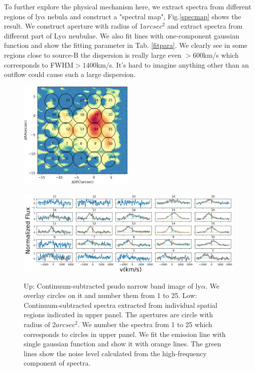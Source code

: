 \documentclass[../Results.tex]{subfiles}
\begin{document}
	To further explore the physical mechanism here, we extract spectra from different regions of ly$\alpha$ nebula and construct a "spectral map", Fig.\ref{specmap} shows the result. We construct aperture with radius of 1$arcsec^{2}$ and extract spectra from different part of Ly$\alpha$ neubulae. We also fit lines with one-component gaussian function and show the fitting parameter in Tab. \ref{fitpara}. We clearly see in some regions close to source-B the dispersion is really large even $>600$km/s which corresponds to FWHM$>1400$km/s. It's hard to imagine anything other than an outflow could cause such a large dispersion.
	\begin{figure}[htp]
		\centering
		\includegraphics[width=0.5\textwidth]{figs/apertmap.png}
	\end{figure}
	\begin{figure}[htp]
		\centering
		\includegraphics[width=\textwidth,height=0.45\textwidth]{figs/specmap}
		\label{spectralss}
		\caption{Up: Continuum-subtracted psudo narrow band image of ly$\alpha$. We overlay circles on it and number them from 1 to 25.  Low: Continuum-subtracted spectra extracted from individual spatial regions indicated in upper panel. The apertures are circle with radius of 2$arcsec^{2}$. We number the spectra from 1 to 25 which corresponds to circles in upper panel. We fit the emission line with single gaussian function and show it with orange lines. The green lines show the noise level calculated from the high-frequency component of spectra. }
	\end{figure}
\end{document}
